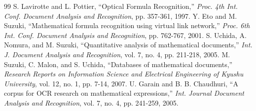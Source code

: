 \documentclass[10pt]{article}
\begin{document}
\begin{thebibliography}{99}
 S. Lavirotte and L. Pottier, ``Optical Formula Recognition,'' \textit{Proc. 4th Int. Conf. Document Analysis and Recognition}, pp. 357-361, 1997.
 Y. Eto and M. Suzuki, ``Mathematical formula recognition using virtual link network,'' \textit{Proc. 6th Int. Conf. Document Analysis and Recognition}, pp. 762-767, 2001.
 S. Uchida, A. Nomura, and M. Suzuki, ``Quantitative analysis of mathematical documents,'' \textit{Int. J. Document Analysis and Recognition}, vol. 7, no. 4, pp. 211-218, 2005.
 M. Suzuki, C. Malon, and S. Uchida, ``Databases of mathematical documents,'' \textit{Research Reports on Information Science and Electrical Engineering of Kyushu University}, vol. 12, no. 1, pp. 7-14, 2007.
 U. Garain and B. B. Chaudhuri, ``A corpus for OCR research on mathematical expressions,'' \textit{Int. Journal Document Analysis and Recognition}, vol. 7, no. 4, pp. 241-259, 2005.
\end{thebibliography}
\end{document}
